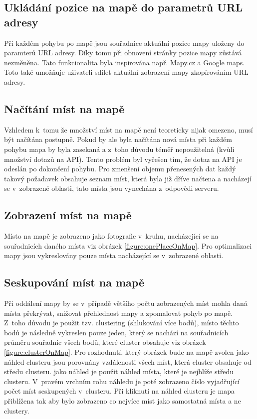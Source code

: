 \documentclass[12pt, a4paper,
  oneside,      %
]{report}
\begin{document}
\subsection{Ukládání pozice na mapě do parametrů URL adresy}
Při každém pohybu po mapě jsou souřadnice aktuální pozice mapy uloženy do paramterů URL adresy. Díky tomu při obnovení stránky pozice mapy zůstává nezměněna. Tato funkcionalita byla inspirována např. Mapy.cz a Google maps. Toto také umožňuje uživateli sdílet aktuální zobrazení mapy zkopírováním URL adresy.
\subsection{Načítání míst na mapě}
Vzhledem k~tomu že množství míst na mapě není teoreticky nijak omezeno, musí být načítána postupně. Pokud by ale byla načítána nová místa při každém pohybu mapa by byla zasekaná a z~toho důvodu téměř nepoužitelná (kvůli množství dotazů na API). Tento problém byl vyřešen tím, že dotaz na API je odeslán po dokončení pohybu. Pro zmenšení objemu přenesených dat každý takový požadavek obsahuje seznam míst, která byla již dříve načtena a nacházejí se v~zobrazené oblasti, tato místa jsou vynechána z~odpovědi serveru.
\subsection{Zobrazení míst na mapě}
Místo na mapě je zobrazeno jako fotografie v~kruhu, nacházející se na souřadnicích daného místa viz obrázek \ref{figure:onePlaceOnMap}. Pro optimalizaci mapy jsou vykreslovány pouze místa nacházející se v~zobrazené oblasti.
\subsection{Seskupování míst na mapě}
Při oddálení mapy by se v~případě většího počtu zobrazených míst mohla daná místa překrývat, snižovat přehlednost mapy a zpomalovat pohyb po mapě. Z~toho důvodu je použit tzv. clustering (shlukování více bodů), místo těchto bodů je následně vykreslen pouze jeden, který se nachází na souřadnicích průměru souřadnic všech bodů, které cluster obsahuje viz obrázek \ref{figure:clusterOnMap}. Pro rozhodnutí, který obrázek bude na mapě zvolen jako náhled clusteru jsou porovnány vzdálenosti všech míst, která cluster obsahuje od středu clusteru. jako náhled je použit náhled místa, které je nejblíže středu clusteru. V~pravém vrchním rohu náhledu je poté zobrazeno číslo vyjadřující počet míst seskupených v~clusteru. Při kliknutí na náhled clusteru je mapa přiblížena tak aby bylo zobrazeno co nejvíce míst jako samostatná místa a ne clustery.
\end{document}
